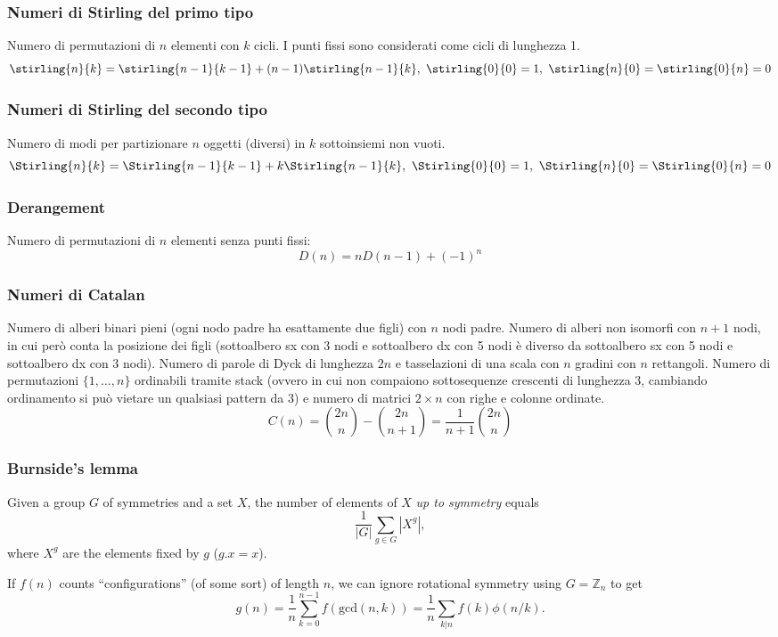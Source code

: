 \subsubsection{Numeri di Stirling del primo tipo}
Numero di permutazioni di $n$ elementi con $k$ cicli. I punti fissi sono considerati come cicli di lunghezza 1.
$$ \stirling{n}{k} = \stirling{n-1}{k-1} + (n-1)\stirling{n-1}{k}, \ \stirling{0}{0}=1, \ \stirling{n}{0}=\stirling{0}{n}=0$$

\subsubsection{Numeri di Stirling del secondo tipo}
Numero di modi per partizionare $n$ oggetti (diversi) in $k$ sottoinsiemi non vuoti.
$$ \Stirling{n}{k} = \Stirling{n-1}{k-1} + k\Stirling{n-1}{k}, \ \Stirling{0}{0}=1,\ \Stirling{n}{0}=\Stirling{0}{n}=0 $$

\subsubsection{Derangement}
Numero di permutazioni di $n$ elementi senza punti fissi: $$ D(n)=nD(n-1)+(-1)^n $$

\subsubsection{Numeri di Catalan}
Numero di alberi binari pieni (ogni nodo padre ha esattamente due figli) con $n$ nodi padre.
Numero di alberi non isomorfi con $n+1$ nodi, in cui però conta la posizione dei figli (sottoalbero sx con 3 nodi e sottoalbero dx con 5 nodi è diverso da sottoalbero sx con 5 nodi e sottoalbero dx con 3 nodi).
Numero di parole di Dyck di lunghezza $2n$ e tasselazioni di una scala con $n$ gradini con $n$ rettangoli.
Numero di permutazioni $\{1,\dots,n\}$ ordinabili tramite stack (ovvero in cui non compaiono sottosequenze crescenti di lunghezza 3, cambiando ordinamento si può vietare un qualsiasi pattern da 3) e numero di matrici $2\times n$ con righe e colonne ordinate.
$$ C(n)=\binom{2n}{n}-\binom{2n}{n+1}=\frac{1}{n+1}\binom{2n}{n} $$

\subsubsection{Burnside's lemma}
		Given a group $G$ of symmetries and a set $X$, the number of elements of $X$ \emph{up to symmetry} equals
		 \[ {\frac {1}{|G|}}\sum _{{g\in G}}|X^{g}|, \]
		 where $X^{g}$ are the elements fixed by $g$ ($g.x = x$).

		 If $f(n)$ counts ``configurations'' (of some sort) of length $n$, we can ignore rotational symmetry using $G = \mathbb Z_n$ to get
		 \[ g(n) = \frac 1 n \sum_{k=0}^{n-1}{f(\text{gcd}(n, k))} = \frac 1 n \sum_{k|n}{f(k)\phi(n/k)}. \]

